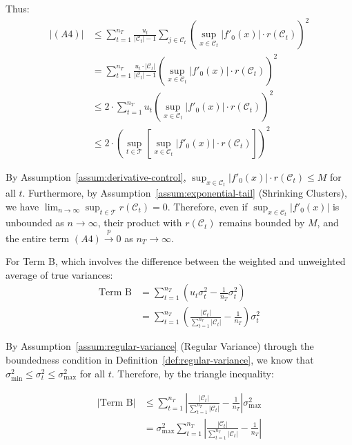 \documentclass{mytemplate}
\begin{document}
Thus:
\begin{align*}
|(A4)| &\leq \sum_{t=1}^{n_T} \frac{u_t}{|\mathcal{C}_t|-1} \sum_{j \in \mathcal{C}_t} \left(\sup_{x \in \mathcal{C}_t} |f'_0(x)| \cdot r(\mathcal{C}_t)\right)^2 \\
&= \sum_{t=1}^{n_T} \frac{u_t \cdot |\mathcal{C}_t|}{|\mathcal{C}_t|-1} \left(\sup_{x \in \mathcal{C}_t} |f'_0(x)| \cdot r(\mathcal{C}_t)\right)^2 \\
&\leq 2 \cdot \sum_{t=1}^{n_T} u_t \left(\sup_{x \in \mathcal{C}_t} |f'_0(x)| \cdot r(\mathcal{C}_t)\right)^2 \\
&\leq 2 \cdot \left(\sup_{t \in \mathcal{T}} \left[\sup_{x \in \mathcal{C}_t} |f'_0(x)| \cdot r(\mathcal{C}_t)\right]\right)^2
\end{align*}

By Assumption~\ref{assum:derivative-control}, $\sup_{x \in \mathcal{C}_t} |f'_0(x)| \cdot r(\mathcal{C}_t) \leq M$ for all $t$. Furthermore, by Assumption~\ref{assum:exponential-tail} (Shrinking Clusters), we have $\lim_{n \to \infty} \sup_{t \in \mathcal{T}} r(\mathcal{C}_t) = 0$. Therefore, even if $\sup_{x \in \mathcal{C}_t} |f'_0(x)|$ is unbounded as $n \to \infty$, their product with $r(\mathcal{C}_t)$ remains bounded by $M$, and the entire term $(A4) \xrightarrow{p} 0$ as $n_T \to \infty$. 


For Term B, which involves the difference between the weighted and unweighted average of true variances:
\begin{align*}
\text{Term B} &= \sum_{t=1}^{n_T}\left(u_t \sigma_t^2 - \frac{1}{n_T} \sigma_t^2\right) \\
&= \sum_{t=1}^{n_T}\left(\frac{|\mathcal{C}_t|}{\sum_{t=1}^{n_T}|\mathcal{C}_t|} - \frac{1}{n_T}\right) \sigma_t^2
\end{align*}

By Assumption~\ref{assum:regular-variance} (Regular Variance) through the boundedness condition in Definition~\ref{def:regular-variance}, we know that $\sigma_{\min}^2 \leq \sigma_t^2 \leq \sigma_{\max}^2$ for all $t$. Therefore, by the triangle inequality:

\begin{align*}
|\text{Term B}| &\leq \sum_{t=1}^{n_T}\left|\frac{|\mathcal{C}_t|}{\sum_{t=1}^{n_T}|\mathcal{C}_t|} - \frac{1}{n_T}\right| \sigma_{\max}^2 \\
&= \sigma_{\max}^2 \sum_{t=1}^{n_T}\left|\frac{|\mathcal{C}_t|}{\sum_{t=1}^{n_T}|\mathcal{C}_t|} - \frac{1}{n_T}\right|
\end{align*}
\end{document}
